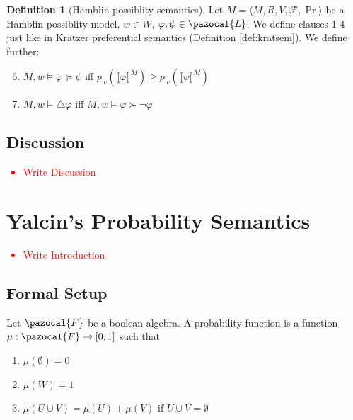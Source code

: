 \documentclass{article}
\theoremstyle{definition}
\newtheorem{definition}{Definition}
\newcommand\todo[1]{\textcolor{red}{#1}}
\renewcommand{\L}{\pazocal{L}}
\newcommand{\F}{\pazocal{F}}
\newcommand{\lb}{\llbracket}
\newcommand{\rb}{\rrbracket}
\begin{document}
\begin{definition}[Hamblin possiblity semantics]
    \label{def:hambsem}
    Let $M = \langle M,R,V,\mathcal{F},\Pr \rangle$ be a Hamblin possiblity model, $w \in W$, $\varphi, \psi \in \L$. We define clauses 1-4 just like in Kratzer preferential semantics (Definition \ref{def:kratsem}). We define further:
    \begin{enumerate}[nosep]
  \setcounter{enumi}{5}
      \item $M,w \models \varphi \succeq \psi$ iff $p_w(\lb \varphi \rb^M) \geq p_w(\lb \psi \rb^M) $
      \item $M,w \models \triangle \varphi$ iff $M,w \models \varphi \succ \neg \varphi$ 
    \end{enumerate}
\end{definition}
\subsection{Discussion}
\todo{
  \begin{itemize}
    \item Write Discussion
  \end{itemize}
}
\section{Yalcin's Probability Semantics}

\todo{
  \begin{itemize}
    \item Write Introduction
  \end{itemize}
}
\subsection{Formal Setup}

\noindent Let $\F$ be a boolean algebra. A probability function is a function $\mu: \F \rightarrow [0,1]$ such that
\begin{enumerate}[nosep]
  \item $\mu(\emptyset) = 0$ 
  \item $\mu(W) = 1$
  \item $\mu(U \cup V) = \mu(U) + \mu(V) \text{ if } U \cup V = \emptyset $
\end{enumerate}
\end{document}
